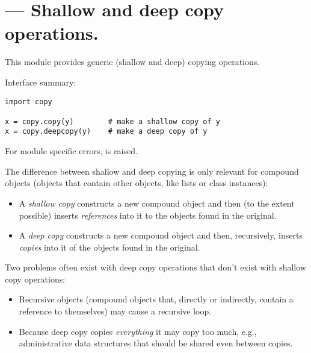 \section{ ---
         Shallow and deep copy operations.}



This module provides generic (shallow and deep) copying operations.

Interface summary:

\begin{verbatim}
import copy

x = copy.copy(y)        # make a shallow copy of y
x = copy.deepcopy(y)    # make a deep copy of y
\end{verbatim}
%
For module specific errors,  is raised.

The difference between shallow and deep copying is only relevant for
compound objects (objects that contain other objects, like lists or
class instances):

\begin{itemize}

\item
A \emph{shallow copy} constructs a new compound object and then (to the
extent possible) inserts \emph{references} into it to the objects found
in the original.

\item
A \emph{deep copy} constructs a new compound object and then,
recursively, inserts \emph{copies} into it of the objects found in the
original.

\end{itemize}

Two problems often exist with deep copy operations that don't exist
with shallow copy operations:

\begin{itemize}

\item
Recursive objects (compound objects that, directly or indirectly,
contain a reference to themselves) may cause a recursive loop.

\item
Because deep copy copies \emph{everything} it may copy too much,
e.g., administrative data structures that should be shared even
between copies.

\end{itemize}

